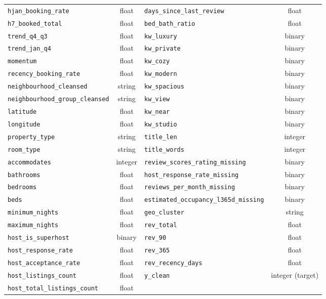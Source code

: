 \documentclass[review,12pt]{elsarticle}
\begin{document}
\begin{longtable}{lc|lc}
\texttt{hjan\_booking\_rate} & float & \texttt{days\_since\_last\_review} & float \\
\texttt{h7\_booked\_total} & float & \texttt{bed\_bath\_ratio} & float \\
\texttt{trend\_q4\_q3} & float & \texttt{kw\_luxury} & binary \\
\texttt{trend\_jan\_q4} & float & \texttt{kw\_private} & binary \\
\texttt{momentum} & float & \texttt{kw\_cozy} & binary \\
\texttt{recency\_booking\_rate} & float & \texttt{kw\_modern} & binary \\
\texttt{neighbourhood\_cleansed} & string & \texttt{kw\_spacious} & binary \\
\texttt{neighbourhood\_group\_cleansed} & string & \texttt{kw\_view} & binary \\
\texttt{latitude} & float & \texttt{kw\_near} & binary \\
\texttt{longitude} & float & \texttt{kw\_studio} & binary \\
\texttt{property\_type} & string & \texttt{title\_len} & integer \\
\texttt{room\_type} & string & \texttt{title\_words} & integer \\
\texttt{accommodates} & integer & \texttt{review\_scores\_rating\_missing} & binary \\
\texttt{bathrooms} & float & \texttt{host\_response\_rate\_missing} & binary \\
\texttt{bedrooms} & float & \texttt{reviews\_per\_month\_missing} & binary \\
\texttt{beds} & float & \texttt{estimated\_occupancy\_l365d\_missing} & binary \\
\texttt{minimum\_nights} & float & \texttt{geo\_cluster} & string \\
\texttt{maximum\_nights} & float & \texttt{rev\_total} & float \\
\texttt{host\_is\_superhost} & binary & \texttt{rev\_90} & float \\
\texttt{host\_response\_rate} & float & \texttt{rev\_365} & float \\
\texttt{host\_acceptance\_rate} & float & \texttt{rev\_recency\_days} & float \\
\texttt{host\_listings\_count} & float & \texttt{y\_clean} & integer (target) \\
\texttt{host\_total\_listings\_count} & float &  &  \\
\end{longtable}
\normalsize



\end{document}
